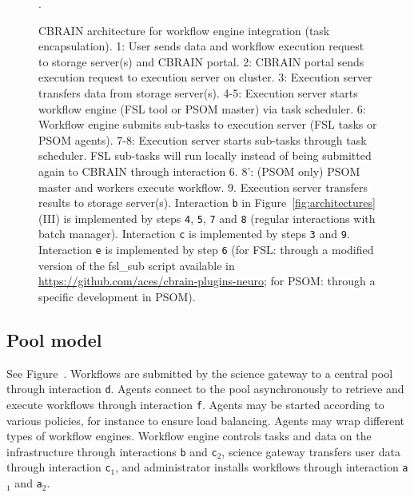 \documentclass[preprint,3p,twocolumn]{elsarticle}
\begin{document}
\begin{figure}
\centering
{} \hfill {}.{ \def\svgwidth{\columnwidth}
  
\label{fig:cbrain-psom-architecture}
}
\caption{CBRAIN architecture for workflow engine integration
  (task encapsulation).  1: User sends data and workflow execution request to
  storage server(s) and CBRAIN portal. 2: CBRAIN portal sends
  execution request to execution server on cluster. 3: Execution
  server transfers data from storage server(s). 4-5: Execution server
  starts workflow engine (FSL tool or PSOM master) via task
  scheduler. 6: Workflow engine submits sub-tasks to execution server
  (FSL tasks or PSOM agents). 7-8: Execution server starts sub-tasks
  through task scheduler. FSL sub-tasks will run locally
  instead of being submitted again to CBRAIN through interaction 6. 8':
  (PSOM only) PSOM master and workers execute workflow. 9. Execution
  server transfers results to storage server(s). Interaction
  \texttt{b} in Figure~\ref{fig:architectures}(III) is implemented by steps
  \texttt{4}, \texttt{5}, \texttt{7} and \texttt{8} (regular
  interactions with batch manager). Interaction \texttt{c} is
  implemented by steps \texttt{3} and \texttt{9}. Interaction
  \texttt{e} is implemented by step \texttt{6} (for FSL: through a
  modified version of the fsl\_sub script available in
  \url{https://github.com/aces/cbrain-plugins-neuro}; for PSOM:
  through a specific development in PSOM).}
\label{fig:cbrain-sub-tasking}
\end{figure}

\subsection{Pool model}
\label{sec:pool}
See Figure~. Workflows are submitted by the science
gateway to a central pool through interaction \texttt{d}. Agents connect to
the pool asynchronously to retrieve and execute workflows through
interaction \texttt{f}. Agents may be started according to various
policies, for instance to ensure load balancing. Agents may wrap
different types of workflow engines. Workflow engine controls tasks
and data on the infrastructure through interactions \texttt{b} and
\texttt{c$_2$}, science gateway transfers user data through
interaction \texttt{c$_1$}, and administrator installs workflows
through interaction \texttt{a$_1$} and \texttt{a$_2$}.
\end{document}
